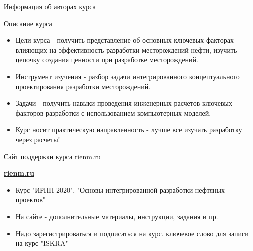 \begin{frame}{Информация об авторах курса}

    
\end{frame}

\begin{frame}{Описание курса}
\begin{itemize}
    \item Цели курса - получить представление об основных ключевых факторах влияющих на эффективность разработки месторождений нефти, изучить цепочку создания ценности при разработке месторождений.
    \item Инструмент изучения - разбор задачи интегрированного концептуального проектирования разработки месторождений.
    \item Задачи - получить навыки проведения инженерных расчетов ключевых факторов разработки с использованием компьютерных моделей.
    \item Курс носит практическую направленность - лучше все изучать разработку через расчеты!
\end{itemize}
\end{frame}

\begin{frame}{Сайт поддержки курса \href{rienm.ru}{rienm.ru}}
\begin{center}
 \textbf{ \href{rienm.ru}{rienm.ru}   }
\end{center}
 
\begin{itemize}
    \item Курс "ИРНП-2020", "Основы интегрированной разработки нефтяных проектов"
    \item На сайте - дополнительные материалы, инструкции, задания и пр.
    \item Надо зарегистрироваться и подписаться на курс. ключевое слово для записи на курс "ISKRA"
\end{itemize}
    
\end{frame}

